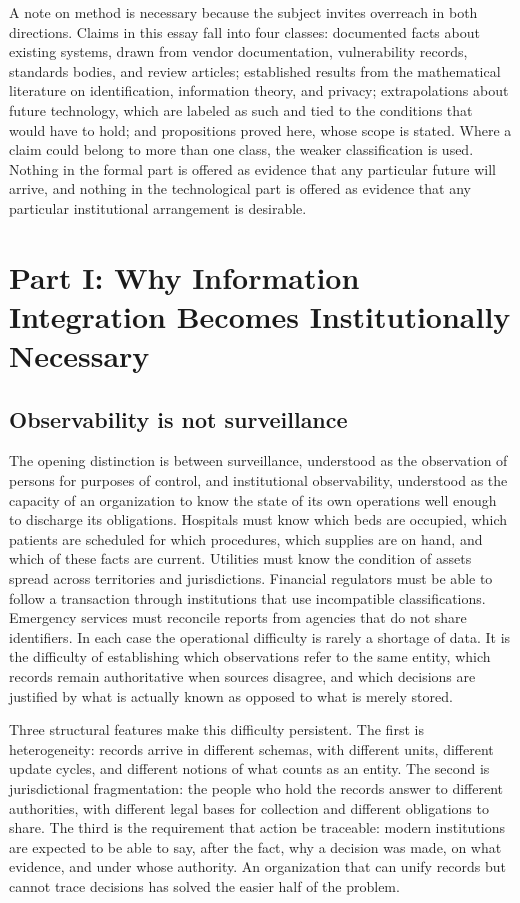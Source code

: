 \documentclass[11pt]{article}
\theoremstyle{plain}
\theoremstyle{definition}
\theoremstyle{remark}
\begin{document}
A note on method is necessary because the subject invites overreach in both directions. Claims in this essay fall into four classes: documented facts about existing systems, drawn from vendor documentation, vulnerability records, standards bodies, and review articles; established results from the mathematical literature on identification, information theory, and privacy; extrapolations about future technology, which are labeled as such and tied to the conditions that would have to hold; and propositions proved here, whose scope is stated. Where a claim could belong to more than one class, the weaker classification is used. Nothing in the formal part is offered as evidence that any particular future will arrive, and nothing in the technological part is offered as evidence that any particular institutional arrangement is desirable.

\section{Part I: Why Information Integration Becomes Institutionally Necessary}

\subsection{Observability is not surveillance}

The opening distinction is between surveillance, understood as the observation of persons for purposes of control, and institutional observability, understood as the capacity of an organization to know the state of its own operations well enough to discharge its obligations. Hospitals must know which beds are occupied, which patients are scheduled for which procedures, which supplies are on hand, and which of these facts are current. Utilities must know the condition of assets spread across territories and jurisdictions. Financial regulators must be able to follow a transaction through institutions that use incompatible classifications. Emergency services must reconcile reports from agencies that do not share identifiers. In each case the operational difficulty is rarely a shortage of data. It is the difficulty of establishing which observations refer to the same entity, which records remain authoritative when sources disagree, and which decisions are justified by what is actually known as opposed to what is merely stored.

Three structural features make this difficulty persistent. The first is heterogeneity: records arrive in different schemas, with different units, different update cycles, and different notions of what counts as an entity. The second is jurisdictional fragmentation: the people who hold the records answer to different authorities, with different legal bases for collection and different obligations to share. The third is the requirement that action be traceable: modern institutions are expected to be able to say, after the fact, why a decision was made, on what evidence, and under whose authority. An organization that can unify records but cannot trace decisions has solved the easier half of the problem.
\end{document}
